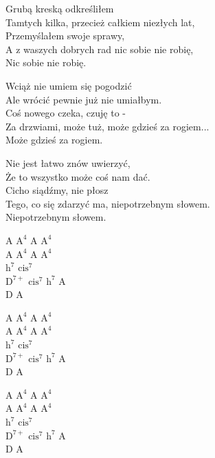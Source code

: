 \begin{text}
    Grubą kreską odkreśliłem\\
    Tamtych kilka, przecież całkiem niezłych lat,\\
    Przemyślałem swoje sprawy,\\
    A z waszych dobrych rad nic sobie nie robię,\\
    Nic sobie nie robię.

    Wciąż nie umiem się pogodzić\\
    Ale wrócić pewnie już nie umiałbym.\\
    Coś nowego czeka, czuję to -\\
    Za drzwiami, może tuż, może gdzieś za rogiem...\\
    Może gdzieś za rogiem.

    Nie jest łatwo znów uwierzyć,\\
    Że to wszystko może coś nam dać.\\
    Cicho siądźmy, nie płosz\\
    Tego, co się zdarzyć ma, niepotrzebnym słowem.\\
    Niepotrzebnym słowem.
\end{text}
\begin{chord}
    A $\mathrm{A^4}$ A $\mathrm{A^4}$\\
    A $\mathrm{A^4}$ A $\mathrm{A^4}$\\
    $\mathrm{h^7}$ $\mathrm{cis^7}$\\
    $\mathrm{D^{7+}}$ $\mathrm{cis^7}$ $\mathrm{h^7}$ A\\
    D A

    A $\mathrm{A^4}$ A $\mathrm{A^4}$\\
    A $\mathrm{A^4}$ A $\mathrm{A^4}$\\
    $\mathrm{h^7}$ $\mathrm{cis^7}$\\
    $\mathrm{D^{7+}}$ $\mathrm{cis^7}$ $\mathrm{h^7}$ A\\
    D A

    A $\mathrm{A^4}$ A $\mathrm{A^4}$\\
    A $\mathrm{A^4}$ A $\mathrm{A^4}$\\
    $\mathrm{h^7}$ $\mathrm{cis^7}$\\
    $\mathrm{D^{7+}}$ $\mathrm{cis^7}$ $\mathrm{h^7}$ A\\
    D A
\end{chord}
